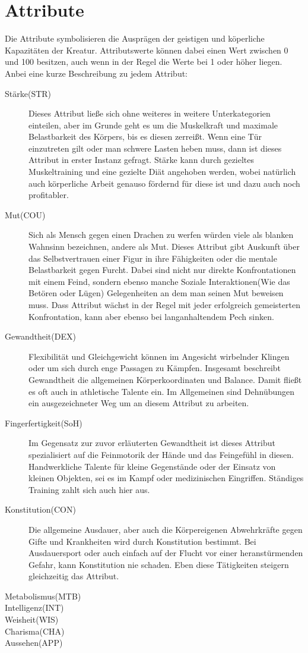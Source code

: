 \documentclass[a4paper,12pt,oneside]{book}
\begin{document}
\chapter{Attribute}
Die Attribute symbolisieren die Ausprägen der geistigen und köperliche Kapazitäten der Kreatur. Attributswerte können dabei einen Wert zwischen 0 und 100 besitzen, auch wenn in der Regel die Werte bei 1 oder höher liegen. Anbei eine kurze Beschreibung zu jedem Attribut:
\begin{description}
\item[Stärke(STR)]
Dieses Attribut ließe sich ohne weiteres in weitere Unterkategorien einteilen, aber im Grunde geht es um die Muskelkraft und maximale Belastbarkeit des Körpers, bis es diesen zerreißt. Wenn eine Tür einzutreten gilt oder man schwere Lasten heben muss, dann ist dieses Attribut in erster Instanz gefragt. Stärke kann durch gezieltes Muskeltraining und eine gezielte Diät angehoben werden, wobei natürlich auch körperliche Arbeit genauso fördernd für diese ist und dazu auch noch profitabler.
\item[Mut(COU)]
Sich als Mensch gegen einen Drachen zu werfen würden viele als blanken Wahnsinn bezeichnen, andere als Mut. Dieses Attribut gibt Auskunft über das Selbstvertrauen einer Figur in ihre Fähigkeiten oder die mentale Belastbarkeit gegen Furcht. Dabei sind nicht nur direkte Konfrontationen mit einem Feind, sondern ebenso manche Soziale Interaktionen(Wie das Betören oder Lügen) Gelegenheiten an dem man seinen Mut beweisen muss. Dass Attribut wächst in der Regel mit jeder erfolgreich gemeisterten Konfrontation, kann aber ebenso bei langanhaltendem Pech sinken.
\item[Gewandtheit(DEX)]
Flexibilität und Gleichgewicht können im Angesicht wirbelnder Klingen oder um sich durch enge Passagen zu Kämpfen. Insgesamt beschreibt Gewandtheit die allgemeinen Körperkoordinaten und Balance. Damit fließt es oft auch in athletische Talente ein. Im Allgemeinen sind Dehnübungen ein ausgezeichneter Weg um an diesem Attribut zu arbeiten.
\item[Fingerfertigkeit(SoH)]
Im Gegensatz zur zuvor erläuterten Gewandtheit ist dieses Attribut spezialisiert auf die Feinmotorik der Hände und das Feingefühl in diesen. Handwerkliche Talente für kleine Gegenstände oder der Einsatz von kleinen Objekten, sei es im Kampf oder medizinischen Eingriffen. Ständiges Training zahlt sich auch hier aus.
\item[Konstitution(CON)]
Die allgemeine Ausdauer, aber auch die Körpereigenen Abwehrkräfte gegen Gifte und Krankheiten wird durch Konstitution bestimmt. Bei Ausdauersport oder auch einfach auf der Flucht vor einer heranstürmenden Gefahr, kann Konstitution nie schaden. Eben diese Tätigkeiten steigern gleichzeitig das Attribut.
\item[Metabolismus(MTB)]

\item[Intelligenz(INT)]
\item[Weisheit(WIS)]
\item[Charisma(CHA)]
\item[Aussehen(APP)]
\end{description}
\end{document}
